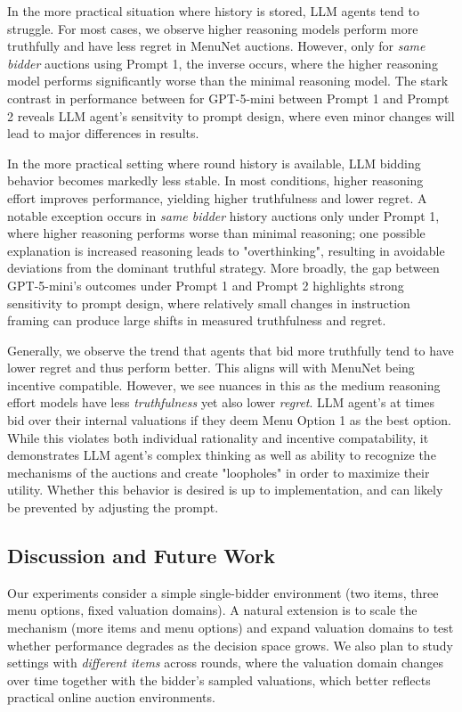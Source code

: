 \documentclass[a4paper]{article}
\begin{document}
In the more practical situation where history is stored, LLM agents tend to struggle. For most cases, we observe higher reasoning models perform more truthfully and have less regret in MenuNet auctions. However, only for \emph{same bidder} auctions using Prompt 1, the inverse occurs, where the higher reasoning model performs significantly worse than the minimal reasoning model. The stark contrast in performance between for GPT-5-mini between Prompt 1 and Prompt 2 reveals LLM agent's sensitvity to prompt design, where even minor changes will lead to major differences in results.

In the more practical setting where round history is available, LLM bidding behavior becomes markedly less stable. In most conditions, higher reasoning effort improves performance, yielding higher truthfulness and lower regret. A notable exception occurs in \emph{same bidder} history auctions only under Prompt 1, where higher reasoning performs worse than minimal reasoning; one possible explanation is increased reasoning leads to "overthinking", resulting in avoidable deviations from the dominant truthful strategy. More broadly, the gap between GPT-5-mini’s outcomes under Prompt 1 and Prompt 2 highlights strong sensitivity to prompt design, where relatively small changes in instruction framing can produce large shifts in measured truthfulness and regret.

Generally, we observe the trend that agents that bid more truthfully tend to have lower regret and thus perform better. This aligns will with MenuNet being incentive compatible. However, we see nuances in this as the medium reasoning effort models have less \emph{truthfulness} yet also lower \emph{regret}. LLM agent's at times bid over their internal valuations if they deem Menu Option 1 as the best option. While this violates both individual rationality and incentive compatability, it demonstrates LLM agent's complex thinking as well as ability to recognize the mechanisms of the auctions and create "loopholes" in order to maximize their utility. Whether this behavior is desired is up to implementation, and can likely be prevented by adjusting the prompt.



\subsection{Discussion and Future Work}
Our experiments consider a simple single-bidder environment (two items, three menu options, fixed valuation domains). A natural extension is to scale the mechanism (more items and menu options) and expand valuation domains to test whether performance degrades as the decision space grows. We also plan to study settings with \emph{different items} across rounds, where the valuation domain changes over time together with the bidder's sampled valuations, which better reflects practical online auction environments.
\end{document}
